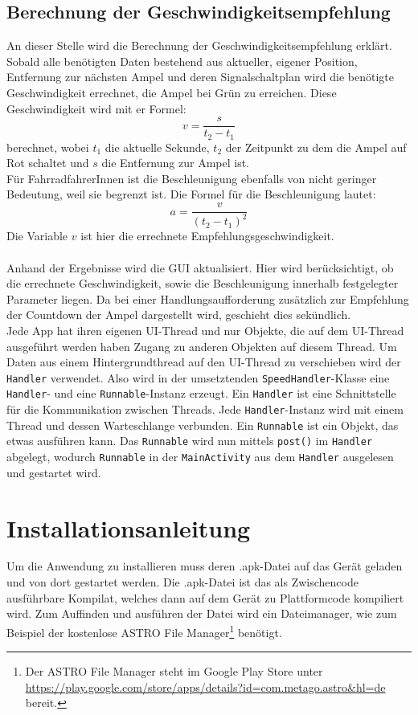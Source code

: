 \subsection{Berechnung der Geschwindigkeitsempfehlung}
An dieser Stelle wird die Berechnung der Geschwindigkeitsempfehlung erklärt. Sobald alle benötigten Daten bestehend aus aktueller, eigener Position, Entfernung zur nächsten Ampel und deren Signalschaltplan wird die benötigte Geschwindigkeit errechnet, die Ampel bei Grün zu erreichen. Diese Geschwindigkeit wird mit er Formel: 
\[ v = \frac{s}{t_{2} - t_{1}} \]
berechnet, wobei $t_1$ die aktuelle Sekunde, $t_2$ der Zeitpunkt zu dem die Ampel auf Rot schaltet und $s$ die Entfernung zur Ampel ist. \\
Für FahrradfahrerInnen ist die Beschleunigung ebenfalls von nicht geringer Bedeutung, weil sie begrenzt ist. Die Formel für die Beschleunigung lautet:
\[ a = \frac{v}{(t_{2} - t_{1})^{2}} \] 
Die Variable $v$ ist hier die errechnete Empfehlungsgeschwindigkeit.\\\\
Anhand der Ergebnisse wird die \gls{GUI} aktualisiert. Hier wird berücksichtigt, ob die errechnete Geschwindigkeit, sowie die Beschleunigung innerhalb festgelegter Parameter liegen. Da bei einer Handlungsaufforderung zusätzlich zur Empfehlung der Countdown der Ampel dargestellt wird, geschieht dies sekündlich.\\
Jede \gls{App} hat ihren eigenen \gls{UI}-Thread und nur Objekte, die auf dem \gls{UI}-Thread ausgeführt werden haben Zugang zu anderen Objekten auf diesem Thread. Um Daten aus einem Hintergrundthread auf den \gls{UI}-Thread zu verschieben wird der \texttt{Handler} verwendet.
Also wird in der umsetztenden \texttt{SpeedHandler}-Klasse eine \texttt{Handler}- und eine \texttt{Runnable}-Instanz erzeugt. Ein \texttt{Handler} ist eine Schnittstelle für die Kommunikation zwischen Threads. Jede \texttt{Handler}-Instanz wird mit einem Thread und dessen Warteschlange verbunden. Ein \texttt{Runnable} ist ein Objekt, das etwas ausführen kann. Das \texttt{Runnable} wird nun mittels \texttt{post()} im \texttt{Handler} abgelegt, wodurch \texttt{Runnable} in der \texttt{MainActivity} aus dem \texttt{Handler} ausgelesen und gestartet wird. 
%
%
\section{Installationsanleitung}
Um die Anwendung zu installieren muss deren .apk-Datei auf das Gerät geladen und von dort gestartet werden. Die .apk-Datei ist das als Zwischencode ausführbare Kompilat, welches dann auf dem Gerät zu Plattformcode kompiliert wird. Zum Auffinden und ausführen der Datei wird ein Dateimanager, wie zum Beispiel der kostenlose ASTRO File Manager\footnote{ Der ASTRO File Manager steht im Google Play Store unter \url{https://play.google.com/store/apps/details?id=com.metago.astro&hl=de} bereit.}  benötigt. 
